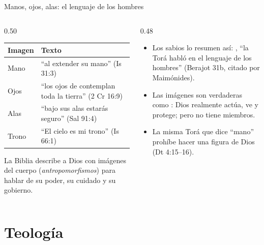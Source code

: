 \begin{frame}{Manos, ojos, alas: el lenguaje de los hombres}
\begin{columns}[t,onlytextwidth]
\begin{column}{0.50\textwidth}\scriptsize\renewcommand{\arraystretch}{1.15}
\begin{tabular}{@{}>{\RaggedRight\arraybackslash}p{1.7cm}>{\RaggedRight\arraybackslash}p{3.9cm}@{}}
\toprule
\textbf{Imagen} & \textbf{Texto} \\ \midrule
Mano & ``al extender \SENOR{} su mano'' (Is 31:3) \\
Ojos & ``los ojos de \SENOR{} contemplan toda la tierra'' (2 Cr 16:9) \\
Alas & ``bajo sus alas estarás seguro'' (Sal 91:4) \\
Trono & ``El cielo es mi trono'' (Is 66:1) \\
\bottomrule
\end{tabular}\par\smallskip
\small La Biblia describe a Dios con imágenes del cuerpo (\emph{antropomorfismos}) para hablar de su poder, su cuidado y su gobierno.
\end{column}
\begin{column}{0.48\textwidth}\small
\begin{itemize}
\item Los sabios lo resumen así: , ``la Torá habló en el lenguaje de los hombres'' (Berajot 31b, citado por Maimónides).
\item Las imágenes son verdaderas como : Dios realmente actúa, ve y protege; pero no tiene miembros.
\item La misma Torá que dice ``mano'' prohíbe hacer una figura de Dios (Dt 4:15--16).
\end{itemize}
\end{column}
\end{columns}\par\smallskip
{}
\end{frame}

\section{Teología}

